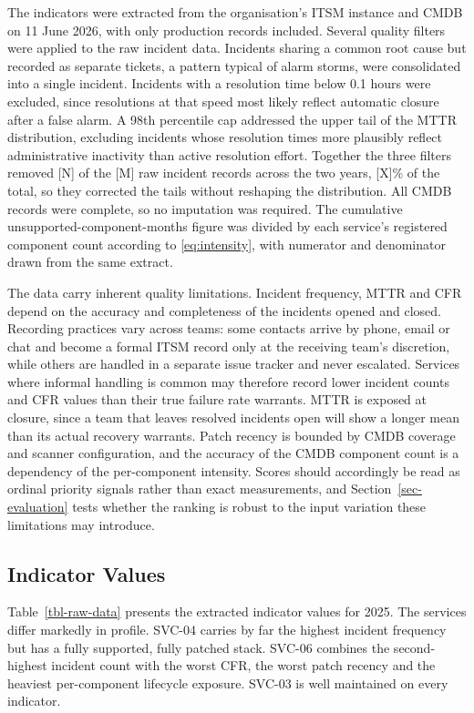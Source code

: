\documentclass[
  journal,
]{IEEEtran}%
\begin{document}
The indicators were extracted from the organisation's ITSM instance and
CMDB on 11 June 2026, with only production records included. Several
quality filters were applied to the raw incident data. Incidents sharing
a common root cause but recorded as separate tickets, a pattern typical
of alarm storms, were consolidated into a single incident. Incidents
with a resolution time below 0.1 hours were excluded, since resolutions
at that speed most likely reflect automatic closure after a false alarm.
A 98th percentile cap addressed the upper tail of the MTTR distribution,
excluding incidents whose resolution times more plausibly reflect
administrative inactivity than active resolution effort. Together the
three filters removed {[}N{]} of the {[}M{]} raw incident records across
the two years, {[}X{]}\% of the total, so they corrected the tails
without reshaping the distribution. All CMDB records were complete, so
no imputation was required. The cumulative unsupported-component-months
figure was divided by each service's registered component count
according to \eqref{eq:intensity}, with numerator and denominator drawn
from the same extract.

The data carry inherent quality limitations. Incident frequency, MTTR
and CFR depend on the accuracy and completeness of the incidents opened
and closed. Recording practices vary across teams: some contacts arrive
by phone, email or chat and become a formal ITSM record only at the
receiving team's discretion, while others are handled in a separate
issue tracker and never escalated. Services where informal handling is
common may therefore record lower incident counts and CFR values than
their true failure rate warrants. MTTR is exposed at closure, since a
team that leaves resolved incidents open will show a longer mean than
its actual recovery warrants. Patch recency is bounded by CMDB coverage
and scanner configuration, and the accuracy of the CMDB component count
is a dependency of the per-component intensity. Scores should
accordingly be read as ordinal priority signals rather than exact
measurements, and Section~\ref{sec-evaluation} tests whether the ranking
is robust to the input variation these limitations may introduce.

\subsection{Indicator Values}\label{indicator-values}

Table~\ref{tbl-raw-data} presents the extracted indicator values for
2025. The services differ markedly in profile. SVC-04 carries by far the
highest incident frequency but has a fully supported, fully patched
stack. SVC-06 combines the second-highest incident count with the worst
CFR, the worst patch recency and the heaviest per-component lifecycle
exposure. SVC-03 is well maintained on every indicator.
\end{document}
